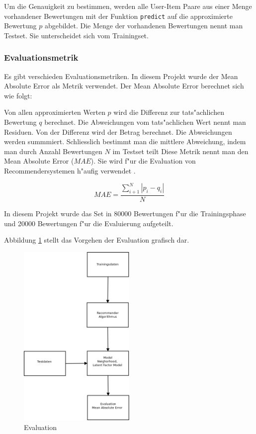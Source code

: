 \documentclass[a4paper, 12pt]{article}
\begin{document}
Um die Genauigkeit zu bestimmen, werden alle User-Item Paare aus einer Menge vorhandener Bewertungen mit der Funktion \verb|predict| auf die approximierte Bewertung $p$ abgebildet. Die Menge der vorhandenen Bewertungen nennt man Testset. Sie unterscheidet sich vom Trainingset.

\subsubsection{Evaluationsmetrik}
\label{sec:evaluationmetrik}

Es gibt verschieden Evaluationsmetriken. In diesem Projekt wurde der Mean Absolute Error als Metrik verwendet. Der Mean Absolute Error berechnet sich wie folgt:

Von allen approximierten Werten $p$ wird die Differenz zur tats"achlichen Bewertung $q$ berechnet. Die Abweichungen vom tats"achlichen Wert nennt man Residuen. Von der Differenz wird der Betrag berechnet. Die Abweichungen werden summmiert. Schliesslich bestimmt man die mittlere Abweichung, indem man durch Anzahl Bewertungen $N$ im Testset teilt 
 Diese Metrik nennt man den Mean Absolute Error ($MAE$). Sie wird f"ur die Evaluation von Recommendersystemen h"aufig verwendet \cite{sarwar01}. 

\begin{equation}
  \label{eq:mae}
  MAE = \frac{\sum_{i+1}^N | p_i-q_i | }{N}
\end{equation}

In diesem Projekt wurde das Set in 80000 Bewertungen f"ur die Trainingsphase und 20000 Bewertungen f"ur die Evaluierung aufgeteilt.

Abbildung \ref{fig:crossvalidation} stellt das Vorgehen der Evaluation grafisch dar.

\begin{figure}
  \centering
      \includegraphics[width=0.5\textwidth]{evaluation}
  \caption{Evaluation}
  \label{fig:crossvalidation}
\end{figure}
\end{document}
